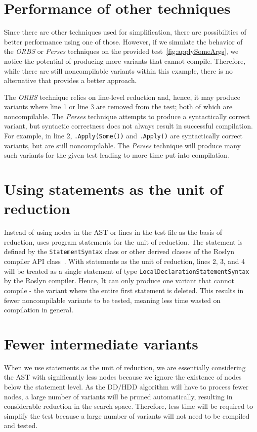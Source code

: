 \section{Performance of other techniques}
Since there are other techniques used for simplification, there are possibilities of better performance using one of those. However, if we simulate the behavior of the \emph{ORBS} or \emph{Perses} techniques on the provided test~\ref{fig:applySomeArgs}, we notice the potential of producing more variants that cannot compile. Therefore, while there are still noncompilable variants within this example, there is no alternative that provides a better approach.

The \emph{ORBS} technique relies on line-level reduction and, hence, it may produce variants where line 1 or line 3 are removed from the test; both of which are noncompilable. The \emph{Perses} technique attempts to produce a syntactically correct variant, but syntactic correctness does not always result in successful compilation. For example, in line 2, \texttt{.Apply(Some())} and \texttt{.Apply()} are syntactically correct variants, but are still noncompilable. The \emph{Perses} technique will produce many such variants for the given test leading to more time put into compilation.


\section{Using statements as the unit of reduction}
Instead of using nodes in the AST or lines in the test file as the basis of reduction, \mytool uses program statements for the unit of reduction. The statement is defined by the \texttt{StatementSyntax} class or other derived classes of the Roslyn compiler API class~\cite{wagner_2021}. With statements as the unit of reduction, lines 2, 3, and 4 will be treated as a single statement of type \texttt{LocalDeclarationStatementSyntax} by the Roslyn compiler. Hence, It can only produce one variant that cannot compile - the variant where the entire first statement is deleted. This results in fewer noncompilable variants to be tested, meaning less time wasted on compilation in general.

\section{Fewer intermediate variants}
When we use statements as the unit of reduction, we are essentially considering the AST with significantly less nodes because we ignore the existence of nodes below the statement level. As the DD/HDD algorithm will have to process fewer nodes, a large number of variants will be pruned automatically, resulting in considerable reduction in the search space. Therefore, less time will be required to simplify the test because a large number of variants will not need to be compiled and tested.

